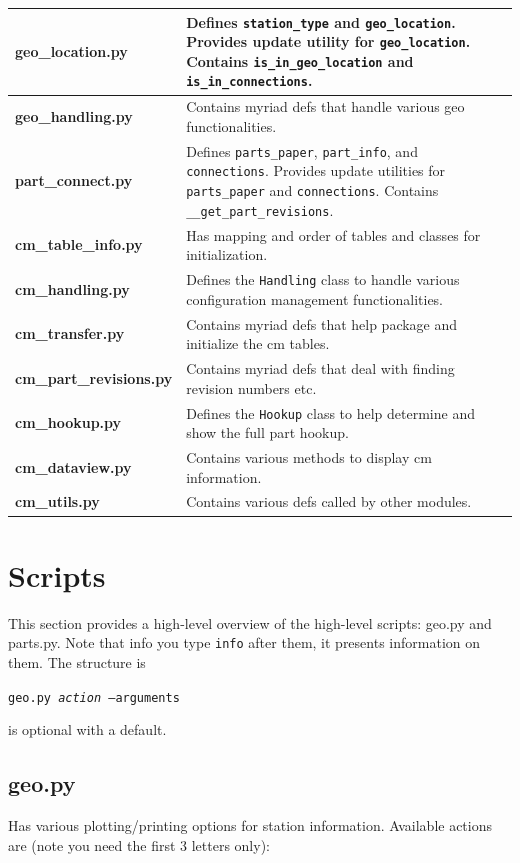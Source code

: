 \documentclass{article}[10pt]
\begin{document}
\begin{tabular}{l p{12cm}}
{\bf geo\_location.py} & Defines {\tt station\_type} and {\tt geo\_location}.  Provides update utility for {\tt geo\_location}.  Contains {\tt is\_in\_geo\_location} and {\tt is\_in\_connections}. \\ \hline
{\bf geo\_handling.py} & Contains myriad defs that handle various geo functionalities.\\ \hline
{\bf part\_connect.py} & Defines {\tt parts\_paper}, {\tt part\_info}, and {\tt connections}.  Provides update utilities for {\tt parts\_paper} and {\tt connections}. Contains {\tt \_\_get\_part\_revisions}. \\ \hline
{\bf cm\_table\_info.py} & Has mapping and order of tables and classes for initialization. \\ \hline
{\bf cm\_handling.py} & Defines the {\tt Handling} class to handle various configuration management functionalities.\\ \hline
{\bf cm\_transfer.py} & Contains myriad defs that help package and initialize the cm tables.\\ \hline
{\bf cm\_part\_revisions.py} & Contains myriad defs that deal with finding revision numbers etc.\\ \hline
{\bf cm\_hookup.py} & Defines the {\tt Hookup} class to help determine and show the full part hookup.\\ \hline
{\bf cm\_dataview.py} & Contains various methods to display cm information.\\ \hline
{\bf cm\_utils.py} & Contains various defs called by other modules.\\
\end{tabular}

\section{Scripts}
\label{sec:scripts}
This section provides a high-level overview of the high-level scripts:  geo.py and parts.py.  Note that info you type {\tt info} after them, it presents information on them.  The structure is 

{\tt geo.py {\it action} --arguments}

 is optional with a default.

\subsection{geo.py}
Has various plotting/printing options for station information.  Available actions are (note you need the first 3 letters only):
\end{document}
